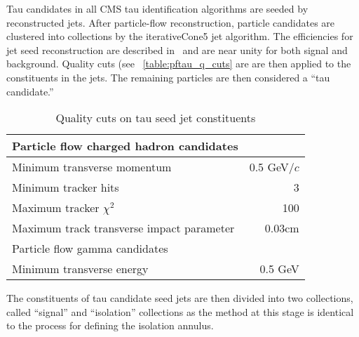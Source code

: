 Tau candidates in all CMS tau identification algorithms are seeded by
reconstructed jets.  After particle-flow reconstruction, particle candidates
are clustered into collections by the iterativeCone5 jet algorithm. The
efficiencies for jet seed reconstruction are described in~\cite{PFT08001} and are near
unity for both signal and background.  Quality cuts (see
~\ref{table:pftau_q_cuts} are are then applied to the constituents in the jets.
The remaining particles are then considered a ``tau candidate.''  

\begin{table}
   \centering
   \caption{Quality cuts on tau seed jet constituents} 
   \begin{tabular}{l r}
      Particle flow charged hadron candidates & \\
      \hline
      Minimum transverse momentum & 0.5 GeV/$c$ \\
      Minimum tracker hits & 3 \\
      Maximum tracker $\chi^2$ & 100 \\
      Maximum track transverse impact parameter & 0.03cm \\
      \hline \hline
      Particle flow gamma candidates & \\
      \hline
      Minimum transverse energy & 0.5 GeV \\
   \end{tabular}
\end{table}

The constituents of tau candidate seed jets are then divided into two
collections, called ``signal'' and ``isolation'' collections as the method at
this stage is identical to the process for defining the isolation annulus.
